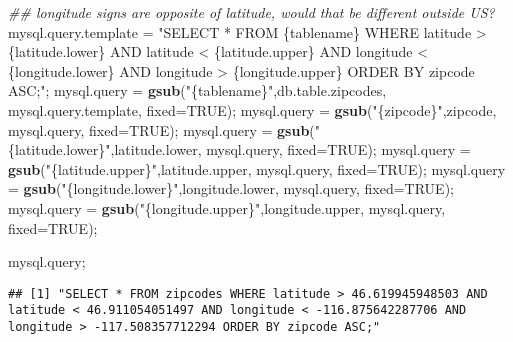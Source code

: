 \documentclass[
]{article}
\newenvironment{Shaded}{\begin{snugshade}}{\end{snugshade}}
\newcommand{\CommentTok}[1]{\textcolor[rgb]{0.56,0.35,0.01}{\textit{#1}}}
\newcommand{\DataTypeTok}[1]{\textcolor[rgb]{0.13,0.29,0.53}{#1}}
\newcommand{\KeywordTok}[1]{\textcolor[rgb]{0.13,0.29,0.53}{\textbf{#1}}}
\newcommand{\NormalTok}[1]{#1}
\newcommand{\OtherTok}[1]{\textcolor[rgb]{0.56,0.35,0.01}{#1}}
\newcommand{\StringTok}[1]{\textcolor[rgb]{0.31,0.60,0.02}{#1}}
\begin{document}
\begin{Shaded}
\begin{Highlighting}[]
\CommentTok{\#\# longitude signs are opposite of latitude, would that be different outside US?}
\NormalTok{mysql.query.template =}\StringTok{ "SELECT * FROM \{tablename\} WHERE latitude \textgreater{} \{latitude.lower\} AND latitude \textless{} \{latitude.upper\} AND longitude \textless{} \{longitude.lower\} AND longitude \textgreater{} \{longitude.upper\} ORDER BY zipcode ASC;"}\NormalTok{;}
\NormalTok{mysql.query =}\StringTok{ }\KeywordTok{gsub}\NormalTok{(}\StringTok{"\{tablename\}"}\NormalTok{,db.table.zipcodes, mysql.query.template, }\DataTypeTok{fixed=}\OtherTok{TRUE}\NormalTok{);}
\NormalTok{mysql.query =}\StringTok{ }\KeywordTok{gsub}\NormalTok{(}\StringTok{"\{zipcode\}"}\NormalTok{,zipcode, mysql.query, }\DataTypeTok{fixed=}\OtherTok{TRUE}\NormalTok{);}
\NormalTok{mysql.query =}\StringTok{ }\KeywordTok{gsub}\NormalTok{(}\StringTok{"\{latitude.lower\}"}\NormalTok{,latitude.lower, mysql.query, }\DataTypeTok{fixed=}\OtherTok{TRUE}\NormalTok{);}
\NormalTok{mysql.query =}\StringTok{ }\KeywordTok{gsub}\NormalTok{(}\StringTok{"\{latitude.upper\}"}\NormalTok{,latitude.upper, mysql.query, }\DataTypeTok{fixed=}\OtherTok{TRUE}\NormalTok{);}
\NormalTok{mysql.query =}\StringTok{ }\KeywordTok{gsub}\NormalTok{(}\StringTok{"\{longitude.lower\}"}\NormalTok{,longitude.lower, mysql.query, }\DataTypeTok{fixed=}\OtherTok{TRUE}\NormalTok{);}
\NormalTok{mysql.query =}\StringTok{ }\KeywordTok{gsub}\NormalTok{(}\StringTok{"\{longitude.upper\}"}\NormalTok{,longitude.upper, mysql.query, }\DataTypeTok{fixed=}\OtherTok{TRUE}\NormalTok{);}

\NormalTok{mysql.query;}
\end{Highlighting}
\end{Shaded}

\begin{verbatim}
## [1] "SELECT * FROM zipcodes WHERE latitude > 46.619945948503 AND latitude < 46.911054051497 AND longitude < -116.875642287706 AND longitude > -117.508357712294 ORDER BY zipcode ASC;"
\end{verbatim}
\end{document}
